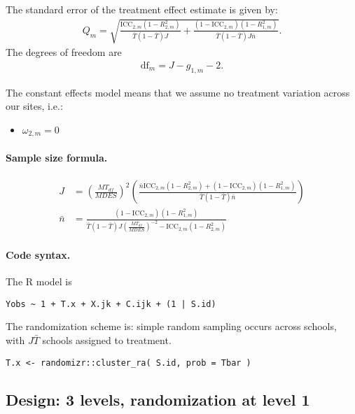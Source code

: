 \documentclass[12pt]{article}
\begin{document}
The standard error of the treatment effect estimate is given by:
\begin{align}
Q_m = \sqrt{\frac{\text{ICC}_{2,m}(1 - R^2_{2,m})}{\bar{T}(1 - \bar{T}) J} + \frac{(1-\text{ICC}_{2,m})(1-R^2_{1,m})}{\bar{T}(1 - \bar{T}) J \bar{n}}}.\end{align}
The degrees of freedom are
\begin{align}\text{df}_m = J - g_{1,m} - 2.\end{align}

The constant effects model means that we assume no treatment variation across our sites, i.e.:
\begin{itemize}
\item $\omega_{2,m} = 0$
\end{itemize}


\paragraph{Sample size formula.} 
\begin{align}
J &= \left(\frac{MT_{df}}{MDES}\right)^2 \left(\frac{ \bar{n} \text{ICC}_{2,m}(1-R^2_{2,m}) + (1-\text{ICC}_{2,m})(1-R^2_{1,m})}{\bar{T}(1 - \bar{T}) \bar{n}} \right)\\
\bar{n} &= \frac{(1-\text{ICC}_{2,m})(1-R^2_{1,m})}{\bar{T}(1 - \bar{T}) J \left(\frac{MT_{df}}{MDES}\right)^{-2} - \text{ICC}_{2,m}(1-R^2_{2,m})  }
\end{align}


\paragraph{Code syntax.}
The R model is
\begin{verbatim}
Yobs ~ 1 + T.x + X.jk + C.ijk + (1 | S.id)
\end{verbatim}

The randomization scheme is: simple random sampling occurs across schools, with $J\bar{T}$ schools assigned to treatment.
\begin{verbatim}
T.x <- randomizr::cluster_ra( S.id, prob = Tbar )
\end{verbatim}



\newpage 
\subsection{Design: 3 levels, randomization at level 1}
\end{document}
